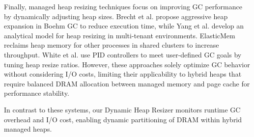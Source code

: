 Finally, managed heap resizing techniques focus on improving GC performance by dynamically adjusting heap sizes. Brecht et al. \cite{brecht} propose aggressive heap expansion in Boehm GC to reduce execution time, while Yang et al. \cite{yang} develop an analytical model for heap resizing in multi-tenant environments. ElasticMem \cite{elasticmem} reclaims heap memory for other processes in shared clusters to increase throughput. White et al. \cite{white} use PID controllers to meet user-defined GC goals by tuning heap resize ratios. However, these approaches solely optimize GC behavior without considering I/O costs, limiting their applicability to hybrid heaps that require balanced DRAM allocation between managed memory and page cache for performance stability.

In contrast to these systems, our Dynamic Heap Resizer monitors runtime GC overhead and I/O cost, enabling dynamic partitioning of DRAM within hybrid managed heaps.
